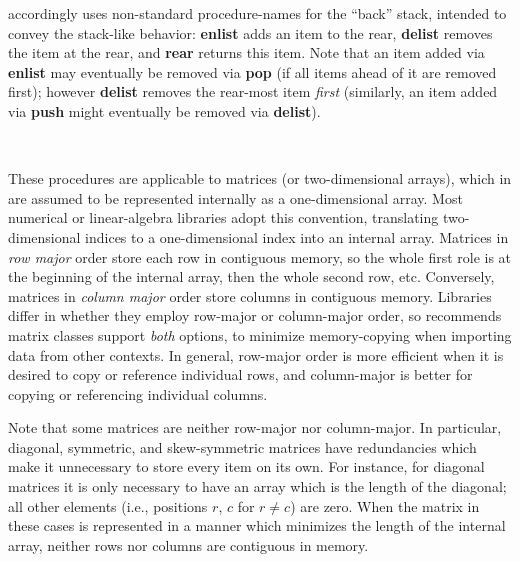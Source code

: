 \documentclass[12pt,letterpaper]{article}
\newcommand{\procitem}[1]{{#1}}
\newcommand{\dprocitem}[1]{{\color{black!60}\textbf{#1}}}
\newcommand{\HGDM}{\resizebox{!}{7.5pt}{\ATexttclr{HGDM}}}
\newcommand{\lHGDM}{\resizebox{!}{8.5pt}{\ATexttclr{H}}%
\resizebox{!}{7.5pt}{\ATexttclr{GDM}}}
\newcommand{\ATexttclr}[1]{\textcolor{tcolor}{\textbf{#1}}}
\newcommand{\q}[1]{{\fontfamily{qcr}\selectfont ``}#1{\fontfamily{qcr}\selectfont ''}}
\begin{document}
{{\begin{description}
\descindent{}  \lHGDM{} accordingly uses non-standard 
procedure-names for the \q{back} stack, intended to 
convey the stack-like behavior: \dprocitem{enlist} 
adds an item to the rear, \dprocitem{delist} removes the 
item at the rear, and \dprocitem{rear} returns this item.  
Note that an item added via \dprocitem{enlist} may 
eventually be removed via \dprocitem{pop} (if all 
items ahead of it are removed first); however 
\dprocitem{delist} removes the rear-most item \textit{first} 
(similarly, an item added via \dprocitem{push} might 
eventually be removed via \dprocitem{delist}).

\vspace*{6pt}   
\item[\parbox{\textwidth}{\procitem{is\_row\_major()}, 
\procitem{is\_column\_major()}, \procitem{is\_diagonal()}, 
\procitem{is\_symmetric()}, \procitem{is\_skew\_symmetric()},
\procitem{get\_matrix\_length()}, 
\procitem{get\_matrix\_size()}}]\ 

\vspace*{-6pt}  
These procedures are applicable to matrices (or two-dimensional 
arrays), which in \HGDM{} are assumed to be represented 
internally as a one-dimensional array.  Most 
numerical or linear-algebra libraries adopt this convention, 
translating two-dimensional indices to a one-dimensional 
index into an internal array.  Matrices in 
\textit{row major} order store each row in contiguous 
memory, so the whole first role is at the beginning 
of the internal array, then the whole second row, etc.  
Conversely, matrices in \textit{column major} order 
store columns in contiguous memory.  Libraries differ in 
whether they employ row-major or column-major order, 
so \HGDM{} recommends matrix classes support \textit{both} 
options, to minimize memory-copying when importing 
data from other contexts.  In general, row-major order is 
more efficient when it is desired to copy or reference 
individual rows, and column-major is better for copying 
or referencing individual columns.

\descindent{}  Note that some matrices are neither 
row-major nor column-major.  In particular, diagonal, 
symmetric, and skew-symmetric matrices have redundancies 
which make it unnecessary to store every item on its own.  
For instance, for diagonal matrices it is only necessary 
to have an array which is the length of the diagonal; all 
other elements (i.e., positions $r$, $c$ for $r \ne{} c$) 
are zero.  When the matrix in these cases is represented 
in a manner which minimizes the length of the internal 
array, neither rows nor columns are contiguous in memory.


\end{description}}}
\end{document}
